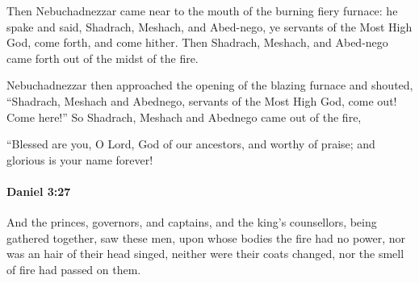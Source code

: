 			\begin{versebox}
					\item[BHS] 
					\item[LXX] 
					\item[ASV] Then Nebuchadnezzar came near to the mouth of the burning fiery furnace: he spake and said, Shadrach, Meshach, and Abed-nego, ye servants of the Most High God, come forth, and come hither. Then Shadrach, Meshach, and Abed-nego came forth out of the midst of the fire.
					\item[NIV] Nebuchadnezzar then approached the opening of the blazing furnace and shouted, “Shadrach, Meshach and Abednego, servants of the Most High God, come out! Come here!” So Shadrach, Meshach and Abednego came out of the fire,
					\item[NRSV] “Blessed are you, O Lord, God of our ancestors, and worthy of praise; and glorious is your name forever!
			\end{versebox}

		\paragraph{Daniel 3:27} %
			\label{DANIEL-3-27}

			And the princes, governors, and captains, and the king’s counsellors, being gathered together, saw these men, upon whose bodies the fire had no power, nor was an hair of their head singed, neither were their coats changed, nor the smell of fire had passed on them.

